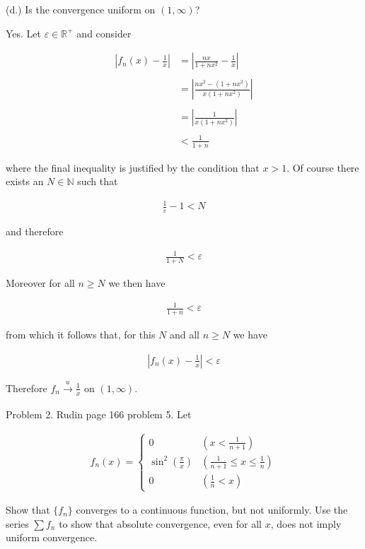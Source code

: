 \documentclass{article}
\begin{document}
    \pagebreak

  {\Large \color{Sepia} (d.) Is the convergence uniform on $(1,\infty)$?}

  \vspace{1cm}

    Yes.  Let $\varepsilon \in \mathbb R^+$ and consider 

    \begin{align*}
      \left| f_n(x)-\frac 1 x \right| &= \left| \frac{nx}{1+nx^2}-\frac 1 x\right| \\\\
      &= \left| \frac{nx^2 - (1+nx^2)}{x(1+nx^2)} \right| \\\\
      &= \left| \frac{1}{x(1+nx^2)} \right| \\\\
      &< \frac 1 {1+n}
    \end{align*}

    where the final inequality is justified by the condition that $x > 1$.  Of course there exists an $N\in\mathbb N$ such that 

    \begin{align*}
      \frac{1}{\varepsilon}-1 < N
    \end{align*}

    and therefore 

    \begin{align*}
      \frac{1}{1+N} < \varepsilon
    \end{align*}

    Moreover for all $n\geq N$ we then have 

    \begin{align*}
      \frac 1 {1+n} < \varepsilon
    \end{align*}

    from which it follows that, for this $N$ and all $n\geq N$ we have 

    \begin{align*}
      \left|f_n(x)-\frac 1 x\right| < \varepsilon
    \end{align*}

    Therefore $f_n\xrightarrow[]{u}\frac 1 x$ on $(1,\infty)$.

  \pagebreak

  {\Large \color{Sepia} Problem 2. Rudin page 166 problem 5. Let 
  
    \begin{align*}
      f_n(x) = \begin{cases}
        0 & \left(x<\frac{1}{n+1}\right) \\
        \sin^2\left( \frac \pi x \right) & \left(\frac{1}{n+1} \le x \le \frac 1 n\right) \\
        0 & \left(\frac 1 n < x\right)
      \end{cases}
    \end{align*}

    Show that $\{f_n\}$ converges to a continuous function, but not uniformly.  Use the series $\sum f_n$ to show that absolute convergence, even for all $x$, does not imply uniform convergence.
  
  }
\end{document}
